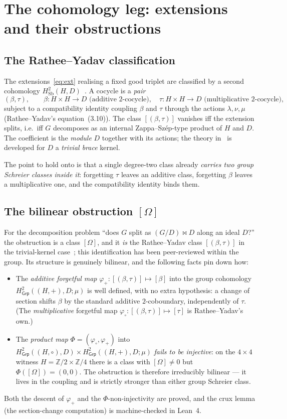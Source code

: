 \documentclass[11pt]{article}
\theoremstyle{definition}
\newcommand{\Sb}{\mathrm{Sb}}
\newcommand{\Grp}{\mathsf{Grp}}
\newcommand{\Z}{\mathbb{Z}}
\newcommand{\Hgp}{H^2_{\Grp}}
\begin{document}
\section{The cohomology leg: extensions and their obstructions}\label{sec:cohom}

\subsection{The Rathee--Yadav classification}
The extensions~\eqref{eq:ext} realising a fixed good triplet are classified by a second
cohomology $H^2_{\Sb}(H,D)$~\cite{RY}. A cocycle is a \emph{pair}
\[
(\beta,\tau),\qquad
\beta\colon H\times H\to D \text{ (additive $2$-cocycle)},\quad
\tau\colon H\times H\to D \text{ (multiplicative $2$-cocycle)},
\]
subject to a compatibility identity coupling $\beta$ and $\tau$ through the actions
$\lambda,\nu,\mu$ (Rathee--Yadav's equation~(3.10)). The class $[(\beta,\tau)]$ vanishes iff
the extension splits, i.e.\ iff $G$ decomposes as an internal Zappa--Sz\'ep-type product of
$H$ and $D$. The coefficient is the \emph{module} $D$ together with its actions; the theory
in~\cite{RY} is developed for $D$ a \emph{trivial brace} kernel.

The point to hold onto is that a single degree-two class already \emph{carries two group
Schreier classes inside it}: forgetting $\tau$ leaves an additive class, forgetting $\beta$
leaves a multiplicative one, and the compatibility identity binds them.

\subsection{The bilinear obstruction $[\Omega]$}
For the decomposition problem ``does $G$ split as $(G/D)\bowtie D$ along an ideal $D$?'' the
obstruction is a class $[\Omega]$, and it \emph{is} the Rathee--Yadav class $[(\beta,\tau)]$
in the trivial-kernel case~\cite{RY}; this identification has been peer-reviewed within the
group. Its structure is genuinely bilinear, and the following facts pin down how:
\begin{itemize}
\item The \emph{additive forgetful map} $\varphi_+\colon [(\beta,\tau)]\mapsto[\beta]$ into
the group cohomology $\Hgp((H,+),D;\mu)$ is well defined, with no extra hypothesis: a change
of section shifts $\beta$ by the standard additive $2$-coboundary, independently of $\tau$.
(The \emph{multiplicative} forgetful map $\varphi_\circ\colon[(\beta,\tau)]\mapsto[\tau]$ is
Rathee--Yadav's own.)
\item The \emph{product map} $\Phi=(\varphi_\circ,\varphi_+)$ into
$H^2_{\Grp}((H,\circ),D)\times \Hgp((H,+),D;\mu)$ \emph{fails to be injective}: on the
$4\times4$ witness $H=\Z/2\times\Z/4$ there is a class with $[\Omega]\neq0$ but
$\Phi([\Omega])=(0,0)$. The obstruction is therefore irreducibly bilinear --- it lives in the
coupling and is strictly stronger than either group Schreier class.
\end{itemize}
Both the descent of $\varphi_+$ and the $\Phi$-non-injectivity are proved, and the crux lemma
(the section-change computation) is machine-checked in Lean~4.
\end{document}
